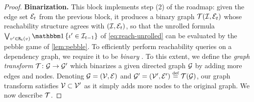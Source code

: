 \documentclass{article}
\begin{document}
\begin{proof}
    \textbf{Binarization.}
    This block implements step (2) of the roadmap: given the edge set ${\mathcal{E}}_t$ from the previous block, it produces a binary graph ${{ \mathcal{T}}}({{\mathcal{I}}}, {\mathcal{E}}_t)$ whose reachability structure agrees with $({{\mathcal{I}}}, {\mathcal{E}}_t)$, so that the unrolled formula $\bigvee_{v' \in \reachable_t(v)} \ind{\itm' \in \items_{t-1}}$ of \cref{eq:reach-unrolled} can be evaluated by the pebble game of \cref{lem:pebble}.
    To efficiently perform reachability queries on a dependency graph, we require it to be \emph{binary} \citep{rytter-2pda}.
    To this extent, we define the \emph{graph transform} ${{ \mathcal{T}}} \colon { \mathcal{G}} \to { \mathcal{G}}'$ which binarizes a given directed graph ${ \mathcal{G}}$ by adding more edges and nodes.
    Denoting ${ \mathcal{G}} = ({\mathcal{V}}, {\mathcal{E}})$ and $\graph' = (\vertices', \edges') \defeq \gtransform(\graph)$, our graph transform satisfies ${\mathcal{V}} \subset {\mathcal{V}}'$ as it simply adds more nodes to the original graph. 
    We now describe ${{ \mathcal{T}}}$. 
    

\end{proof}
\end{document}
